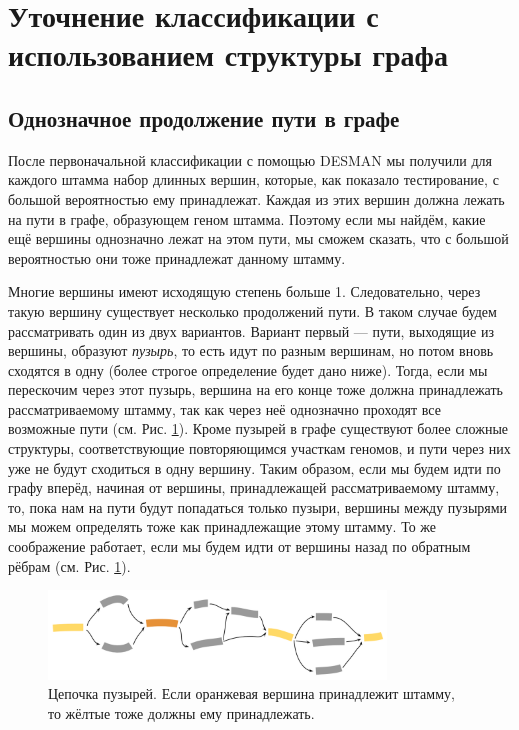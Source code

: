 \documentclass{spbau-diploma}
\begin{document}
\section{Уточнение классификации с использованием структуры графа}
\subsection{Однозначное продолжение пути в графе}
После первоначальной классификации с помощью DESMAN мы получили для каждого штамма набор длинных вершин, которые, как показало тестирование, с большой вероятностью ему принадлежат. Каждая из этих вершин должна лежать на пути в графе, образующем геном штамма. Поэтому если мы найдём, какие ещё вершины однозначно лежат на этом пути, мы сможем сказать, что с большой вероятностью они тоже принадлежат данному штамму.

Многие вершины имеют исходящую степень больше 1. Следовательно, через такую вершину существует несколько продолжений пути. В таком случае будем рассматривать один из двух вариантов. Вариант первый --- пути, выходящие из вершины, образуют \textit{пузырь}, то есть идут по разным вершинам, но потом вновь сходятся в одну (более строгое определение будет дано ниже). Тогда, если мы перескочим через этот пузырь, вершина на его конце тоже должна принадлежать рассматриваемому штамму, так как через неё однозначно проходят все возможные пути (см. Рис. \ref{bubbles_chain}). Кроме пузырей в графе существуют более сложные структуры, соответствующие повторяющимся участкам геномов, и пути через них уже не будут сходиться в одну вершину. Таким образом, если мы будем идти по графу вперёд, начиная от вершины, принадлежащей рассматриваемому штамму, то, пока нам на пути будут попадаться только пузыри, вершины между пузырями мы можем определять тоже как принадлежащие этому штамму. То же соображение работает, если мы будем идти от вершины назад по обратным рёбрам (см. Рис. \ref{bubbles_chain}).

\begin{figure}[t]
\centering
\includegraphics[width=0.8\textwidth]{pics/bubbles_chain.png}
\caption{Цепочка пузырей. Если оранжевая вершина принадлежит штамму, то жёлтые тоже должны ему принадлежать.}
\label{bubbles_chain}
\end{figure}
\end{document}
